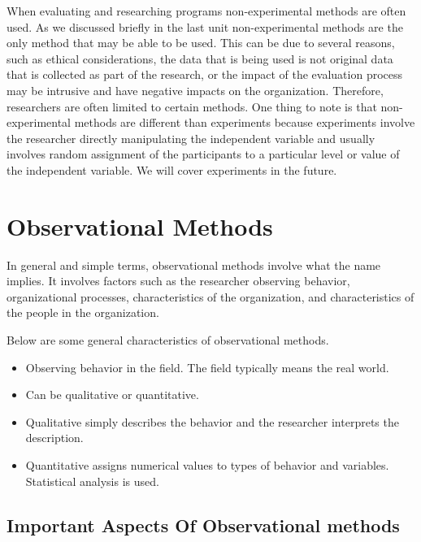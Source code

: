 \documentclass[]{book}
\providecommand{\tightlist}{%
  \setlength{\itemsep}{0pt}\setlength{\parskip}{0pt}}
\theoremstyle{definition}
\theoremstyle{definition}
\theoremstyle{definition}
\theoremstyle{remark}
\begin{document}
When evaluating and researching programs non-experimental methods are
often used. As we discussed briefly in the last unit non-experimental
methods are the only method that may be able to be used. This can be due
to several reasons, such as ethical considerations, the data that is
being used is not original data that is collected as part of the
research, or the impact of the evaluation process may be intrusive and
have negative impacts on the organization. Therefore, researchers are
often limited to certain methods. One thing to note is that
non-experimental methods are different than experiments because
experiments involve the researcher directly manipulating the independent
variable and usually involves random assignment of the participants to a
particular level or value of the independent variable. We will cover
experiments in the future.

\hypertarget{observational-methods}{%
\section{Observational Methods}\label{observational-methods}}

In general and simple terms, observational methods involve what the name
implies. It involves factors such as the researcher observing behavior,
organizational processes, characteristics of the organization, and
characteristics of the people in the organization.

Below are some general characteristics of observational methods.

\begin{itemize}
\tightlist
\item
  Observing behavior in the field. The field typically means the real
  world.
\item
  Can be qualitative or quantitative.
\item
  Qualitative simply describes the behavior and the researcher
  interprets the description.
\item
  Quantitative assigns numerical values to types of behavior and
  variables. Statistical analysis is used.
\end{itemize}

\hypertarget{important-aspects-of-observational-methods}{%
\subsection{Important Aspects Of Observational
methods}\label{important-aspects-of-observational-methods}}
\end{document}
